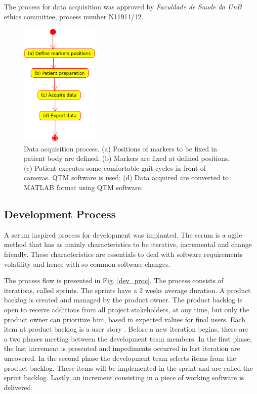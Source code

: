 \documentclass[journal]{IEEEtran}
\begin{document}
The process for data acquisition was approved by 
\emph{Faculdade de Saude da UnB} ethics committee, 
process number N11911/12.

\begin{figure}[!t]
	\centering
	\includegraphics[width=1.5in]{./data_acq_proc.eps}
	\caption{Data acquisition process.
		(a) Positions of markers to be fixed in patient body are defined.
		(b) Markers are fixed at defined positions.
		(c) Patient executes some comfortable gait cycles in front of cameras.
		QTM software is used;
		(d) Data acquired are converted to MATLAB format using QTM software.
	}
	\label{data_acq_proc}
\end{figure}


\subsection{Development Process}

A scrum \cite{Schwaber2001, Schwaber2004, Rubin2012} inspired process for development was implanted.
The scrum is a agile method \cite{Beck2001} that has as mainly characteristics
to be iterative, incremental and change friendly.
These characteristics are essentials to deal with software requirements volatility
and hence with so common software changes.

The process flow is presented in Fig. \ref{dev_proc}.
The process consists of iterations, called sprints.
The sprints have a 2 weeks average duration.
A product backlog is created and managed by the product owner.
The product backlog is open to receive additions from all 
project stakeholders, at any time, but only the product owner can prioritize him,
based in expected values for final users.
Each item at product backlog is a user story \cite{cohn2004}.
Before a new iteration begins, there are a two phases meeting between the development team members. 
In the first phase, the last increment is presented and 
impediments occurred in last iteration are uncovered.
In the second phase the development team selects items from the product backlog.
These items will be implemented in the sprint and are called the sprint backlog.
Lastly, an increment consisting in a piece of working software is delivered.
\end{document}

